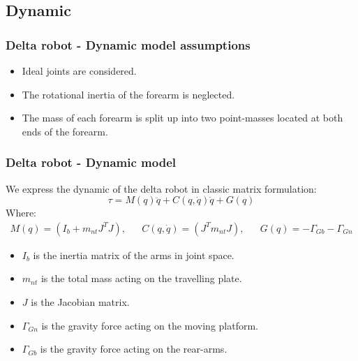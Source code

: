 \subsection{Dynamic}
\begin{frame}
\frametitle{Delta robot - Dynamic model assumptions}
\begin{itemize}
	\item Ideal joints are considered.
	\item The rotational inertia of the forearm is neglected.
	\item The mass of each forearm is split up into two point-masses located at both ends of the forearm.
\end{itemize}
\end{frame}
%
\begin{frame}
\frametitle{Delta robot - Dynamic model}
We express the dynamic of the delta robot in classic matrix formulation:
\begin{equation}
	\tau = M(q)\ddot{q} + C(q,\dot{q})\dot{q} + G(q)
\end{equation}
Where:
\begin{align}
	M(q) = \left(I_b + m_{nt}J^TJ\right), && C(q,\dot{q}) = \left(J^Tm_{nt}J\right), && G(q) = -\Gamma_{Gb} - \Gamma_{Gn}
\end{align}
\begin{itemize}
	\item $I_b$ is the inertia matrix of the arms in joint space.
	\item $m_{nt}$ is the total mass acting on the travelling plate.
	\item $J$ is the Jacobian matrix.
	\item $\Gamma_{Gn}$ is the gravity force acting on the moving platform.
	\item $\Gamma_{Gb}$ is the gravity force acting on the rear-arms.
\end{itemize}
\end{frame}
%
